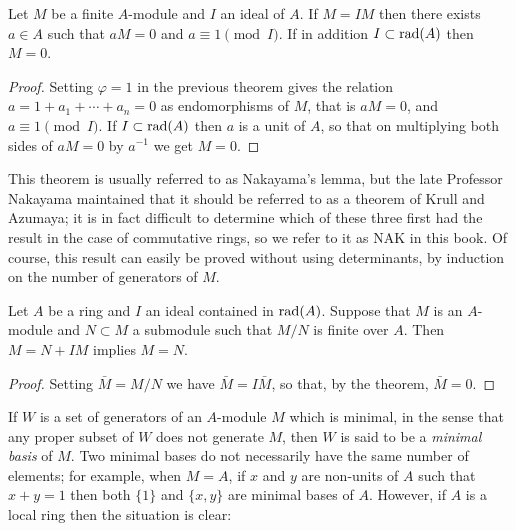 \begin{theorem}[NAK]\label{thm:2.2}
Let $M$ be a finite $A$-module and $I$ an ideal of $A$. If
$M = IM$ then there exists $a \in A$ such that $aM = 0$ and $a \equiv 1 \pmod I$. If in
addition $I \subset \operatorname{rad}(A)$ then $M = 0$.
\end{theorem}

\begin{proof}
Setting $\varphi = 1$ in the previous theorem gives the relation
$a = 1 + a_1 + \cdots + a_n = 0$ as endomorphisms of $M$, that is $aM = 0$, and
$a \equiv 1 \pmod I$. If $I \subset \operatorname{rad}(A)$ then $a$ is a unit of $A$, so that on multiplying
both sides of $aM = 0$ by $a^{-1}$ we get $M = 0$.
\end{proof}

\begin{remark}
This theorem is usually referred to as Nakayama's lemma, but
the late Professor Nakayama maintained that it should be referred to as
a theorem of Krull and Azumaya; it is in fact difficult to determine which
of these three first had the result in the case of commutative rings, so we
refer to it as NAK in this book. Of course, this result can easily be proved
without using determinants, by induction on the number of generators
of $M$.
\end{remark}

\begin{corollary*}
Let $A$ be a ring and $I$ an ideal contained in $\operatorname{rad}(A)$. Suppose
that $M$ is an $A$-module and $N \subset M$ a submodule such that $M/N$ is finite
over $A$. Then $M = N + IM$ implies $M = N$.
\end{corollary*}

\begin{proof}
Setting $\bar{M} = M/N$ we have $\bar{M} = I\bar{M}$, so that, by the
theorem, $\bar{M} = 0$.
\end{proof}

If $W$ is a set of generators of an $A$-module $M$ which is minimal, in the
sense that any proper subset of $W$ does not generate $M$, then $W$ is said
to be a \emph{minimal basis} of $M$. Two minimal bases do not necessarily have
the same number of elements; for example, when $M = A$, if $x$ and $y$ are
non-units of $A$ such that $x + y = 1$ then both $\{1\}$ and $\{x, y\}$ are
minimal bases of $A$. However, if $A$ is a local ring then the situation is clear:

